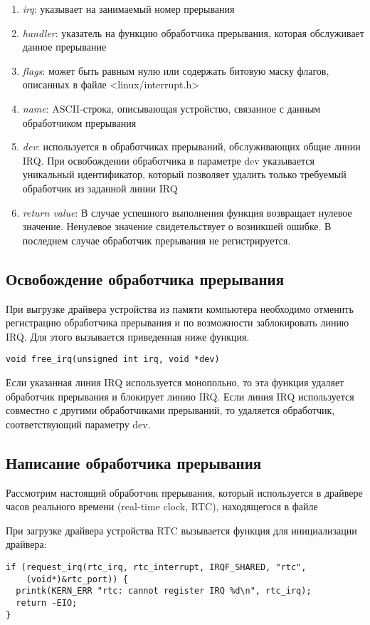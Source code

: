 \begin{enumerate}
    \item\textit{irq}: указывает на занимаемый номер прерывания
    \item\textit{handler}: указатель на функцию обработчика прерывания, которая обслуживает данное прерывание
    \item\textit{flags}: может быть равным нулю или содержать битовую маску флагов, описанных в файле <linux/interrupt.h>
    \item\textit{name}: ASCII-строка, описывающая устройство, связанное с данным обработчиком прерывания
    \item\textit{dev}: используется в обработчиках прерываний, обслуживающих общие линии IRQ. При освобождении обработчика в параметре dev указывается уникальный идентификатор, который позволяет удалить только требуемый обработчик из заданной линии IRQ
    \item\textit{return value}: В случае успешного выполнения функция  возвращает нулевое значение. Ненулевое значение свидетельствует о возникшей ошибке. В последнем случае обработчик прерывания не регистрируется.
\end{enumerate}

\subsection{Освобождение обработчика прерывания}
При выгрузке драйвера устройства из памяти компьютера необходимо отменить регистрацию обработчика прерывания и по возможности заблокировать линию IRQ. Для
этого вызывается приведенная ниже функция.
\begin{lstlisting}
void free_irq(unsigned int irq, void *dev)
\end{lstlisting}
Если указанная линия IRQ используется монопольно, то эта функция удаляет обработчик прерывания и блокирует линию IRQ. Если линия IRQ используется совместно с другими обработчиками прерываний, то удаляется обработчик, соответствующий параметру dev.

\subsection{Написание обработчика прерывания}
Рассмотрим настоящий обработчик прерывания, который используется в драйвере часов реального времени (real-time clock, RTC), находящегося в файле 

При загрузке драйвера устройства RTC вызывается функция  для инициализации драйвера:
\begin{lstlisting}
if (request_irq(rtc_irq, rtc_interrupt, IRQF_SHARED, "rtc", 
    (void*)&rtc_port)) {
  printk(KERN_ERR "rtc: cannot register IRQ %d\n", rtc_irq);
  return -EIO;
}
\end{lstlisting}

